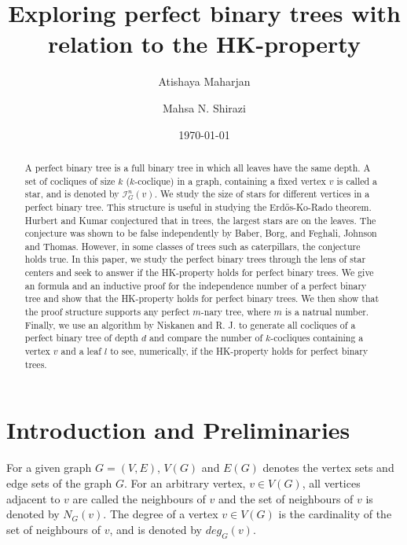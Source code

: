 \documentclass{amsart}
\title[]{Exploring perfect binary trees with relation to the HK-property}
\author[Atishaya Maharjan]{Atishaya Maharjan} \email[Atishaya Maharjan]{maharjaa@myumanitoba.ca}
\author[M.~N.~Shirazi]{Mahsa N. Shirazi} \email[M.~N.~Shirazi]{mahsa.nasrollahi@gmail.com}
\date{\today}
\theoremstyle{definition}
\begin{document}
\begin{abstract}
  A perfect binary tree is a full binary tree in which all leaves have the same depth. A set of cocliques of size $k$ ($k$-coclique) in a graph, containing a fixed vertex $v$ is called a star, and is denoted by $\mathcal{I}^n_G(v)$. We study the size of stars for different vertices in a perfect binary tree. This structure is useful in studying the Erd\H{o}s-Ko-Rado theorem. Hurbert and Kumar conjectured that in trees, the largest stars are on the leaves. The conjecture was shown to be false independently by Baber, Borg, and Feghali, Johnson and Thomas. However, in some classes of trees such as caterpillars, the conjecture holds true. In this paper, we study the perfect binary trees through the lens of star centers and seek to answer if the HK-property holds for perfect binary trees. We give an formula and an inductive proof for the independence number of a perfect binary tree and show that the HK-property holds for perfect binary trees. We then show that the proof structure supports any perfect $m$-nary tree, where $m$ is a natrual number. Finally, we use an algorithm by Niskanen and R. J. to generate all cocliques of a perfect binary tree of depth $d$ and compare the number of $k$-cocliques containing a vertex $v$ and a leaf $l$ to see, numerically, if the HK-property holds for perfect binary trees.
\end{abstract}

\maketitle

\section{Introduction and Preliminaries}
For a given graph $G = (V,E)$, $V(G)$ and $E(G)$ denotes the vertex sets and edge sets of the graph $G$. For an arbitrary vertex, $v \in V(G)$, all vertices adjacent to $v$ are called the neighbours of $v$ and the set of neighbours of $v$ is denoted by $N_G(v)$. The degree of a vertex $v \in V(G)$ is the cardinality of the set of neighbours of $v$, and is denoted by $deg_G(v)$.
\end{document}
